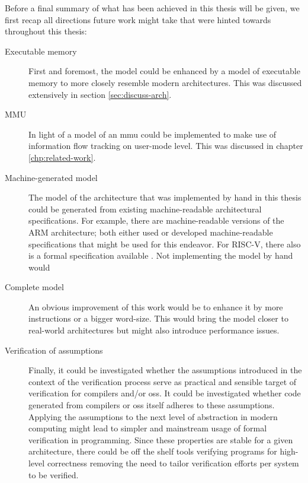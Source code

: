 Before a final summary of what has been achieved in this thesis will be given, we first recap all directions future work might take that were hinted towards throughout this thesis:
\begin{description}
    \item[Executable memory] First and foremost, the model could be enhanced by a model of executable memory to more closely resemble modern architectures.
    This was discussed extensively in section \ref{sec:discuss-arch}.
    \item[MMU] In light of \cite{KhakpourSD13} a model of an \gls{mmu} could be implemented to make use of information flow tracking on user-mode level.
    This was discussed in chapter \ref{chp:related-work}.
    \item[Machine-generated model] The model of the architecture that was implemented by hand in this thesis could be generated from existing machine-readable architectural specifications.
    For example, there are machine-readable versions of the ARM architecture; both \cite{Reid17,Fox02} either used or developed machine-readable specifications that might be used for this endeavor.
    For RISC-V, there also is a formal specification available \cite{RiscvSpecFormal}.
    Not implementing the model by hand would 
    \item[Complete model] An obvious improvement of this work would be to enhance it by more instructions or a bigger word-size.
    This would bring the model closer to real-world architectures but might also introduce performance issues.
    \item[Verification of assumptions] Finally, it could be investigated whether the assumptions introduced in the context of the verification process serve as practical and sensible target of verification for compilers and/or \glspl{os}.
    It could be investigated whether code generated from compilers or \glspl{os} itself adheres to these assumptions.
    Applying the assumptions to the next level of abstraction in modern computing might lead to simpler and mainstream usage of formal verification in programming.
    Since these properties are stable for a given architecture, there could be off the shelf tools verifying programs for high-level correctness removing the need to tailor verification efforts per system to be verified.
\end{description}

